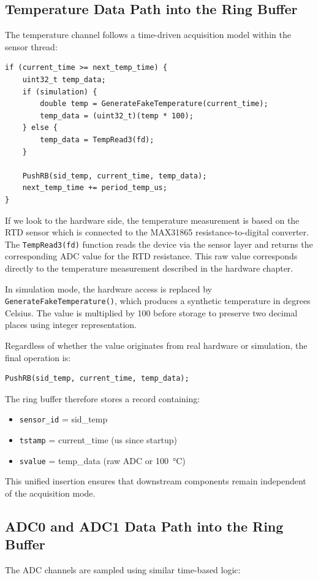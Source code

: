 \subsection{Temperature Data Path into the Ring Buffer}
The temperature channel follows a time-driven acquisition model within the sensor thread:

\begin{verbatim}
if (current_time >= next_temp_time) {
    uint32_t temp_data;
    if (simulation) {
        double temp = GenerateFakeTemperature(current_time);
        temp_data = (uint32_t)(temp * 100);
    } else {
        temp_data = TempRead3(fd);
    }

    PushRB(sid_temp, current_time, temp_data);
    next_temp_time += period_temp_us;
}
\end{verbatim}
If we look to the hardware side, the temperature measurement is based on the RTD sensor which is connected to the MAX31865 resistance-to-digital converter. The \texttt{TempRead3(fd)} function reads the device via the sensor layer and returns the corresponding ADC value for the RTD resistance. This raw value corresponds directly to the temperature measurement described in the hardware chapter.

In simulation mode, the hardware access is replaced by \texttt{GenerateFakeTemperature()}, which produces a synthetic temperature in degrees Celsius. The value is multiplied by 100 before storage to preserve two decimal places using integer representation.

Regardless of whether the value originates from real hardware or simulation, the final operation is:
\begin{verbatim}
PushRB(sid_temp, current_time, temp_data);
\end{verbatim}
The ring buffer therefore stores a record containing:

\begin{itemize}
\item \texttt{sensor\_id} = sid\_temp
\item \texttt{tstamp} = current\_time (us since startup)
\item \texttt{svalue} = temp\_data (raw ADC or \SI{100}{\degreeCelsius})
\end{itemize}
This unified insertion ensures that downstream components remain independent of the acquisition mode.

\subsection{ADC0 and ADC1 Data Path into the Ring Buffer}
The ADC channels are sampled using similar time-based logic:

